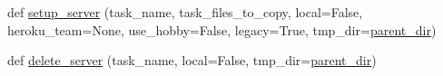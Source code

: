 \begin{DoxyCompactItemize}
\item 
def \hyperlink{namespaceparlai_1_1mturk_1_1core_1_1legacy__2018_1_1server__utils_af65b71753d79d3513be6d4c890853a4d}{setup\+\_\+server} (task\+\_\+name, task\+\_\+files\+\_\+to\+\_\+copy, local=False, heroku\+\_\+team=None, use\+\_\+hobby=False, legacy=True, tmp\+\_\+dir=\hyperlink{namespaceparlai_1_1mturk_1_1core_1_1legacy__2018_1_1server__utils_a6a871d2f8e5c0768a82ab8fa2e7fadae}{parent\+\_\+dir})
\item 
def \hyperlink{namespaceparlai_1_1mturk_1_1core_1_1legacy__2018_1_1server__utils_a034c68a129a95ca47005fc7f81bdfc09}{delete\+\_\+server} (task\+\_\+name, local=False, tmp\+\_\+dir=\hyperlink{namespaceparlai_1_1mturk_1_1core_1_1legacy__2018_1_1server__utils_a6a871d2f8e5c0768a82ab8fa2e7fadae}{parent\+\_\+dir})
\end{DoxyCompactItemize}
